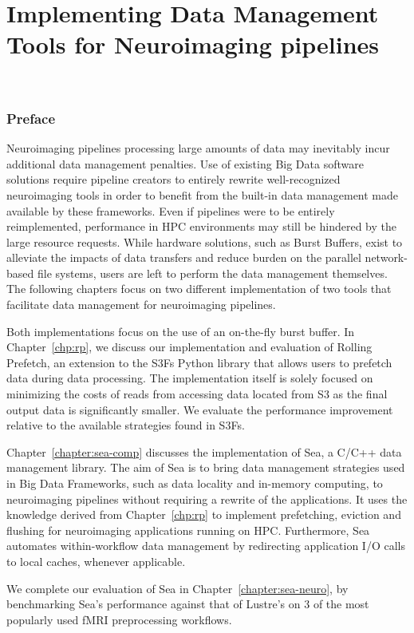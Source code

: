 \part{Implementing Data Management Tools for Neuroimaging pipelines}~\label{part:implementation}
\section*{Preface}

Neuroimaging pipelines processing large amounts of data may inevitably incur
additional data management penalties. Use of existing Big Data software
solutions require pipeline creators to entirely rewrite well-recognized
neuroimaging tools in order to benefit from the built-in data management made
available by these frameworks. Even if pipelines were to be entirely
reimplemented, performance in HPC environments may still be hindered by the
large resource requests. While hardware solutions, such as Burst Buffers, exist
to alleviate the impacts of data transfers and reduce burden on the parallel
network-based file systems, users are left to perform the data management
themselves. The following chapters focus on two different implementation of two
tools that facilitate data management for neuroimaging pipelines. 

Both implementations focus on the use of an on-the-fly burst buffer. In
Chapter~\ref{chp:rp}, we discuss our implementation and evaluation of Rolling
Prefetch, an extension to the S3Fs Python library that allows users to prefetch
data during data processing. The implementation itself is solely focused on
minimizing the costs of reads from accessing data located from S3 as the final
output data is significantly smaller. We evaluate the performance improvement
relative to the available strategies found in S3Fs. 

Chapter~\ref{chapter:sea-comp} discusses the implementation of Sea, a C/C++ data
management library. The aim of Sea is to bring data management strategies used
in Big Data Frameworks, such as data locality and in-memory computing, to
neuroimaging pipelines without requiring a rewrite of the applications. It uses
the knowledge derived from Chapter~\ref{chp:rp} to implement prefetching,
eviction and flushing for neuroimaging applications running on HPC. Furthermore,
Sea automates within-workflow data management by redirecting application I/O
calls to local caches, whenever applicable. 

We complete our evaluation of Sea in Chapter~\ref{chapter:sea-neuro}, by
benchmarking Sea's performance against that of Lustre's on 3 of the most
popularly used fMRI preprocessing workflows.


